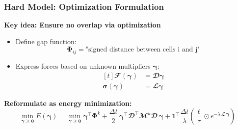 \documentclass[10pt,t]{beamer}
\begin{document}
\begin{frame}
    \frametitle{Hard Model: Optimization Formulation}

    \textbf{Key idea: Ensure no overlap via optimization}
    \begin{itemize}
        \item Define gap function:
              \begin{equation*}
                  \boldsymbol{\Phi}_{ij} = \text{"signed distance between cells i and j"}
              \end{equation*}

        \item Express forces based on unknown multipliers $\boldsymbol{\gamma}$:
              \begin{equation*}
                  \begin{aligned}[t]
                      \mathbfcal{F}(\boldsymbol{\gamma})       & = \mathbfcal{D} \boldsymbol{\gamma} \\
                      \boldsymbol{\sigma}(\boldsymbol{\gamma}) & = \mathbfcal{L} \boldsymbol{\gamma}
                  \end{aligned}
              \end{equation*}
    \end{itemize}

    \textbf{Reformulate as energy minimization:}
    \begin{equation*} \label{eq:energy_function}
        \min_{\boldsymbol{\gamma} \geq \mathbf{0}}
        E(\boldsymbol{\gamma})
        = \min_{\boldsymbol{\gamma} \geq \mathbf{0}} \boldsymbol{\gamma}^\top \boldsymbol{\Phi}^k
        +  \frac{\Delta t}{2}\, \boldsymbol{\gamma}^\top \mathbfcal{D}^\top \mathbfcal{M}^k \mathbfcal{D}\, \boldsymbol{\gamma}
        + \mathbf{1}^\top \frac{\Delta t}{\lambda}
        \left( \frac{\boldsymbol{\ell}}{\tau} \odot e^{-\lambda\, \mathbfcal{L}\, \boldsymbol{\gamma}} \right)
    \end{equation*}

\end{frame}
\end{document}
